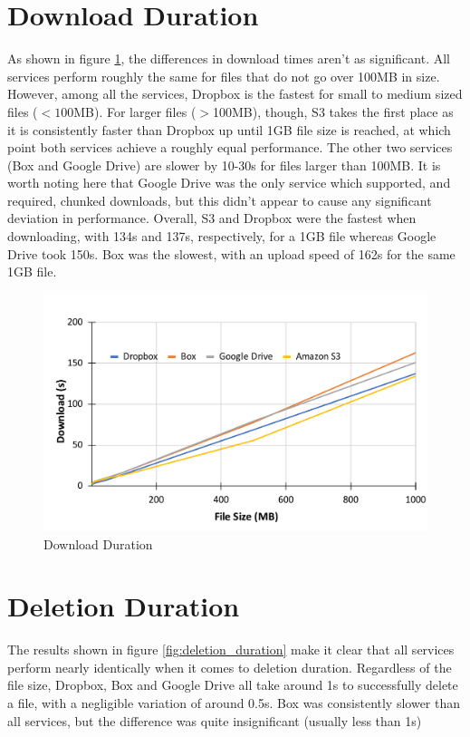 \section{Download Duration}
As shown in figure \ref{fig:download_duration}, the differences in download times aren't as significant. All services perform roughly the same for files that do not go over 100MB in size. However, among all the services, Dropbox is the fastest for small to medium sized files ($< 100$MB). For larger files ($ >$100MB), though, S3 takes the first place as it is consistently faster than Dropbox up until 1GB file size is reached, at which point both services achieve a roughly equal performance. The other two services (Box and Google Drive) are slower by 10-30s for files larger than 100MB. It is worth noting here that Google Drive was the only service which supported, and required, chunked downloads, but this didn't appear to cause any significant deviation in performance. Overall, S3 and Dropbox were the fastest when downloading, with 134s and 137s, respectively, for a 1GB file whereas Google Drive took 150s. Box was the slowest, with an upload speed of 162s for the same 1GB file.

\begin{figure} [!h]
	\centering
	\includegraphics[scale=0.5]{images/download_chart}
	\caption{\label{fig:download_duration}Download Duration}
\end{figure}

\section{Deletion Duration}
The results shown in figure \ref{fig:deletion_duration} make it clear that all services perform nearly identically when it comes to deletion duration. Regardless of the file size, Dropbox, Box and Google Drive all take around 1s to successfully delete a file, with a negligible variation of around 0.5s. Box was consistently slower than all services, but the difference was quite insignificant (usually less than 1s)

